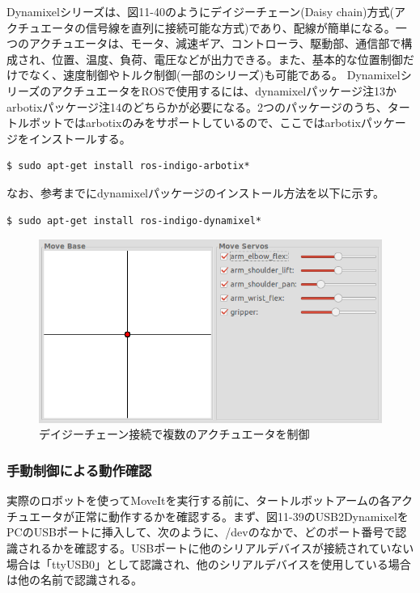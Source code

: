 Dynamixelシリーズは、図11-40のようにデイジーチェーン(Daisy chain)方式(アクチュエータの信号線を直列に接続可能な方式)であり、配線が簡単になる。一つのアクチュエータは、モータ、減速ギア、コントローラ、駆動部、通信部で構成され、位置、温度、負荷、電圧などが出力できる。また、基本的な位置制御だけでなく、速度制御やトルク制御(一部のシリーズ)も可能である。
DynamixelシリーズのアクチュエータをROSで使用するには、dynamixelパッケージ注13かarbotixパッケージ注14のどちらかが必要になる。2つのパッケージのうち、タートルボットではarbotixのみをサポートしているので、ここではarbotixパッケージをインストールする。

\begin{lstlisting}[language=ROS]
$ sudo apt-get install ros-indigo-arbotix*
\end{lstlisting}

なお、参考までにdynamixelパッケージのインストール方法を以下に示す。

\begin{lstlisting}[language=ROS]
$ sudo apt-get install ros-indigo-dynamixel*
\end{lstlisting}

\begin{figure}[ht]
  \centering
  \includegraphics[width=\columnwidth]{pictures/chapter11/pic_11_40.png}
  \caption{デイジーチェーン接続で複数のアクチュエータを制御}
\end{figure}

\subsubsection{手動制御による動作確認}

実際のロボットを使ってMoveItを実行する前に、タートルボットアームの各アクチュエータが正常に動作するかを確認する。まず、図11-39のUSB2DynamixelをPCのUSBポートに挿入して、次のように、/devのなかで、どのポート番号で認識されるかを確認する。USBポートに他のシリアルデバイスが接続されていない場合は「ttyUSB0」として認識され、他のシリアルデバイスを使用している場合は他の名前で認識される。

